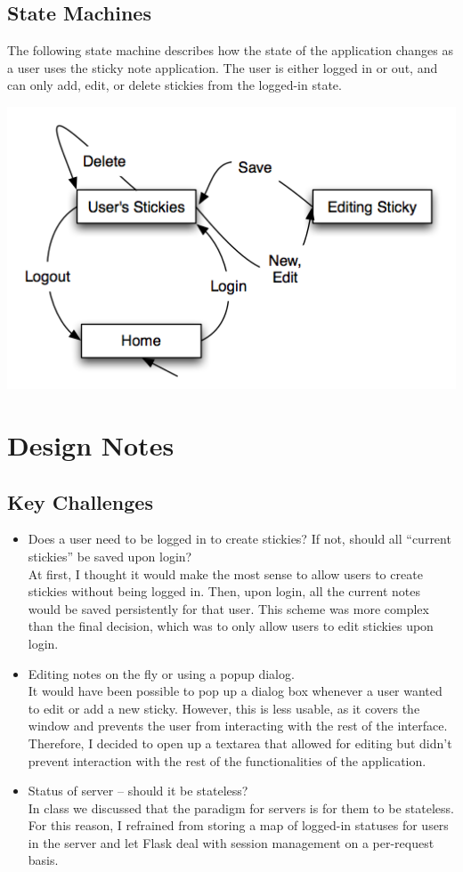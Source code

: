 \documentclass[11pt,letterpaper]{article}
\begin{document}
\subsection{State Machines}
The following state machine describes how the state of the application changes as a user uses the sticky note application. The user is either logged in or out, and can only add, edit, or delete stickies from the logged-in state.
\begin{center}
\includegraphics[width=7in]{dot/statediagram.png}
\label{fig:sm1} 
\end{center}

\section{Design Notes}
\subsection{Key Challenges}
\begin{itemize}
\item Does a user need to be logged in to create stickies? If not, should all ``current stickies'' be saved upon login?\\
At first, I thought it would make the most sense to allow users to create stickies without being logged in. Then, upon login, all the current notes would be saved persistently for that user. This scheme was more complex than the final decision, which was to only allow users to edit stickies upon login.
\item Editing notes on the fly or using a popup dialog.\\
It would have been possible to pop up a dialog box whenever a user wanted to edit or add a new sticky. However, this is less usable, as it covers the window and prevents the user from interacting with the rest of the interface. Therefore, I decided to open up a textarea that allowed for editing but didn't prevent interaction with the rest of the functionalities of the application.
\item Status of server -- should it be stateless?\\
In class we discussed that the paradigm for servers is for them to be stateless. For this reason, I refrained from storing a map of logged-in statuses for users in the server and let Flask deal with session management on a per-request basis.
\end{itemize}
\end{document}
